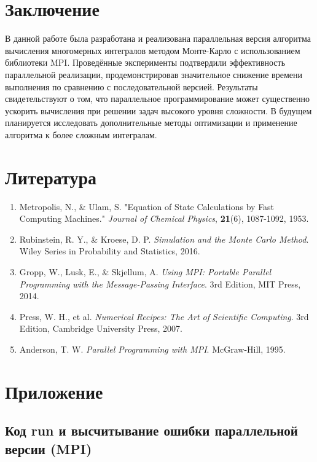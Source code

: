 \documentclass[a4paper,12pt]{article}
\begin{document}
\section{Заключение}

В данной работе была разработана и реализована параллельная версия алгоритма вычисления многомерных интегралов методом Монте-Карло с использованием библиотеки MPI. Проведённые эксперименты подтвердили эффективность параллельной реализации, продемонстрировав значительное снижение времени выполнения по сравнению с последовательной версией. Результаты свидетельствуют о том, что параллельное программирование может существенно ускорить вычисления при решении задач высокого уровня сложности. В будущем планируется исследовать дополнительные методы оптимизации и применение алгоритма к более сложным интегралам.

\section{Литература}

\begin{enumerate}
    \item Metropolis, N., \& Ulam, S. "Equation of State Calculations by Fast Computing Machines." \textit{Journal of Chemical Physics}, \textbf{21}(6), 1087-1092, 1953.
    \item Rubinstein, R. Y., \& Kroese, D. P. \textit{Simulation and the Monte Carlo Method}. Wiley Series in Probability and Statistics, 2016.
    \item Gropp, W., Lusk, E., \& Skjellum, A. \textit{Using MPI: Portable Parallel Programming with the Message-Passing Interface}. 3rd Edition, MIT Press, 2014.
    \item Press, W. H., et al. \textit{Numerical Recipes: The Art of Scientific Computing}. 3rd Edition, Cambridge University Press, 2007.
    \item Anderson, T. W. \textit{Parallel Programming with MPI}. McGraw-Hill, 1995.
\end{enumerate}

\section{Приложение}

\subsection{Код run и высчитывание ошибки параллельной версии (MPI)}
\end{document}
